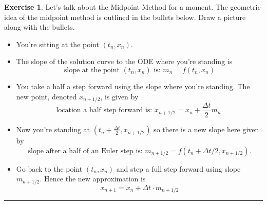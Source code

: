 \documentclass[
]{book}
\providecommand{\tightlist}{%
  \setlength{\itemsep}{0pt}\setlength{\parskip}{0pt}}
\theoremstyle{definition}
\theoremstyle{definition}
\theoremstyle{definition}
\newtheorem{exercise}{Exercise}[chapter]
\theoremstyle{remark}
\begin{document}
\begin{exercise}
\protect\hypertarget{exr:unnamed-chunk-449}{}{\label{exr:unnamed-chunk-449} }Let's talk about the Midpoint Method for a moment. The geometric idea of the midpoint method is outlined in the bullets below. Draw a picture along with the bullets.

\begin{itemize}
\tightlist
\item
  You're sitting at the point \((t_n,x_n)\).
\item
  The slope of the solution curve to the ODE where you're standing is
  \[ \text{slope at the point $(t_n,x_n)$ is: } m_n = f(t_n,x_n) \]
\item
  You take a half a step forward using the slope where you're standing. The new point, denoted \(x_{n+1/2}\), is given by
  \[ \text{location a half step forward is: } x_{n+1/2} = x_n + \frac{\Delta t}{2} m_n. \]
\item
  Now you're standing at \((t_n + \frac{\Delta t}{2} , x_{n+1/2})\) so there is a new slope here given by
  \[ \text{slope after a half of an Euler step is: } m_{n+1/2} = f(t_n+\Delta t/2,x_{n+1/2}). \]
\item
  Go back to the point \((t_n,x_n)\) and step a full step forward using slope \(m_{n+1/2}\). Hence the new approximation is
  \[ x_{n+1} = x_n + \Delta t \cdot m_{n+1/2} \]
\end{itemize}
\end{exercise}

\begin{center}\rule{0.5\linewidth}{0.5pt}\end{center}
\end{document}
